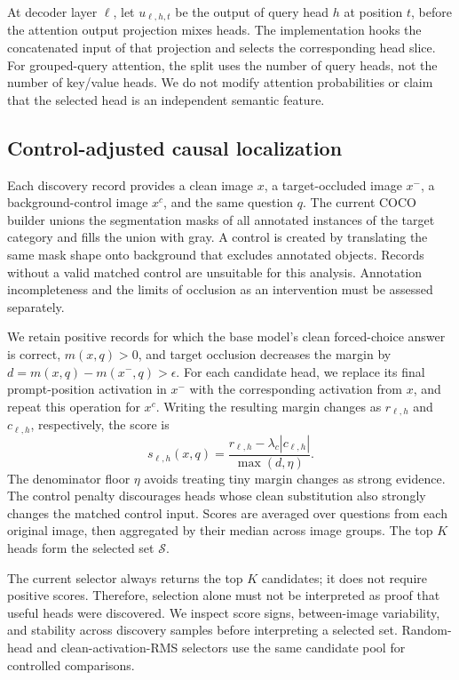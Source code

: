 At decoder layer $\ell$, let $u_{\ell,h,t}$ be the output of query head $h$
at position $t$, before the attention output projection mixes heads. The
implementation hooks the concatenated input of that projection and selects
the corresponding head slice. For grouped-query attention, the split uses
the number of query heads, not the number of key/value heads. We do not
modify attention probabilities or claim that the selected head is an
independent semantic feature.

\subsection{Control-adjusted causal localization}
\label{sec:localize}
Each discovery record provides a clean image $x$, a target-occluded image
$x^{-}$, a background-control image $x^{c}$, and the same question $q$.
The current COCO builder unions the segmentation masks of all annotated
instances of the target category and fills the union with gray. A control
is created by translating the same mask shape onto background that excludes
annotated objects. Records without a valid matched control are unsuitable
for this analysis. Annotation incompleteness and the limits of occlusion
as an intervention must be assessed separately.

We retain positive records for which the base model's clean forced-choice
answer is correct, $m(x,q)>0$, and target occlusion decreases the margin by
$d=m(x,q)-m(x^{-},q)>\epsilon$. For each candidate head, we replace its final
prompt-position activation in $x^{-}$ with the corresponding activation
from $x$, and repeat this operation for $x^{c}$. Writing the resulting
margin changes as $r_{\ell,h}$ and $c_{\ell,h}$, respectively, the score is
\begin{equation}
 s_{\ell,h}(x,q)=
 \frac{r_{\ell,h}-\lambda_c |c_{\ell,h}|}
      {\max(d,\eta)}.
 \label{eq:score}
\end{equation}
The denominator floor $\eta$ avoids treating tiny margin changes as strong
evidence. The control penalty discourages heads whose clean substitution
also strongly changes the matched control input. Scores are averaged over
questions from each original image, then aggregated by their median across
image groups. The top $K$ heads form the selected set $\mathcal{S}$.

The current selector always returns the top $K$ candidates; it does not
require positive scores. Therefore, selection alone must not be interpreted
as proof that useful heads were discovered. We inspect score signs,
between-image variability, and stability across discovery samples before
interpreting a selected set. Random-head and clean-activation-RMS selectors
use the same candidate pool for controlled comparisons.

